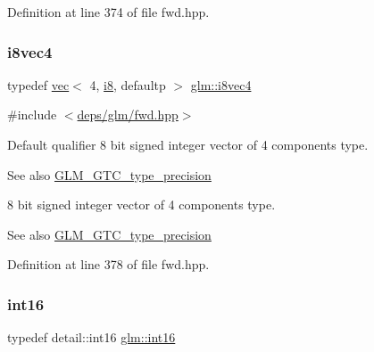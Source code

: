 Definition at line 374 of file fwd.\+hpp.

\mbox{\label{group__gtc__type__precision_gaaad99cfb998ddcb74e9c33d0149fdd0e}} 
\subsubsection{\texorpdfstring{i8vec4}{i8vec4}}
{\footnotesize\ttfamily typedef \hyperlink{structglm_1_1vec}{vec}$<$ 4, \hyperlink{group__gtc__type__precision_gaae064be68b7d36cd7910c16e8ad18bba}{i8}, defaultp $>$ \hyperlink{group__gtc__type__precision_gaaad99cfb998ddcb74e9c33d0149fdd0e}{glm\+::i8vec4}}



{\ttfamily \#include $<$\hyperlink{fwd_8hpp}{deps/glm/fwd.\+hpp}$>$}

Default qualifier 8 bit signed integer vector of 4 components type. \begin{DoxySeeAlso}{See also}
\hyperlink{group__gtc__type__precision}{G\+L\+M\+\_\+\+G\+T\+C\+\_\+type\+\_\+precision}
\end{DoxySeeAlso}
8 bit signed integer vector of 4 components type. \begin{DoxySeeAlso}{See also}
\hyperlink{group__gtc__type__precision}{G\+L\+M\+\_\+\+G\+T\+C\+\_\+type\+\_\+precision} 
\end{DoxySeeAlso}


Definition at line 378 of file fwd.\+hpp.

\mbox{\label{group__gtc__type__precision_ga2945a61d12771f8954994fcddf02b021}} 
\subsubsection{\texorpdfstring{int16}{int16}}
{\footnotesize\ttfamily typedef detail\+::int16 \hyperlink{group__gtc__type__precision_ga2945a61d12771f8954994fcddf02b021}{glm\+::int16}}



